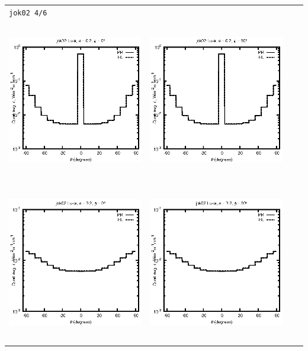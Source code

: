 \begin{tabular}{c c c c}
\multicolumn{4}{l}{\texttt{jok02 4/6}} \\
\includegraphics[height=7cm]{../eps/jok02_Lu_a_fwd.eps} &
\includegraphics[height=7cm]{../eps/jok02_Lu_a_cross.eps}\\
\includegraphics[height=7cm]{../eps/jok02_Lu_w_fwd.eps} &
\includegraphics[height=7cm]{../eps/jok02_Lu_w_cross.eps} \\

\end{tabular}
